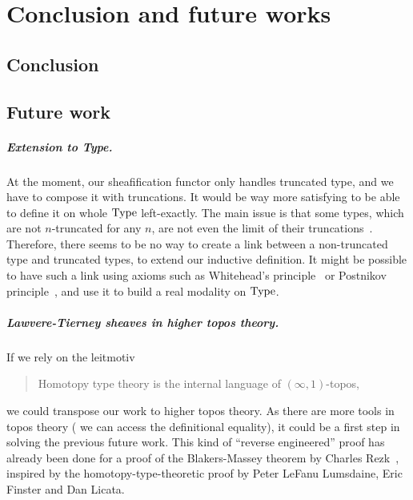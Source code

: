 \chapter{Conclusion and future works}
\label{chap:conclusion}

\section{Conclusion}
\section{Future work}

\paragraph*{Extension to Type.}
At the moment, our sheafification functor only handles truncated type,
and we have to compose it with truncations. It would be way more
satisfying to be able to define it on whole $\operatorname{Type}$ left-exactly. The
main issue is that some types, which are not $n$-truncated for any
$n$, are not even the limit of their
truncations~\cite{morelvv}. Therefore, there seems to be no way to
create a link between a non-truncated type and truncated types, to
extend our inductive definition.
It might be possible to have such a link using axioms such as
Whitehead's principle~\cite[Section 8.8]{hottbook} or Postnikov
principle~\cite[Section 5.5.6]{lurie}, and use it to build a real
modality on $\operatorname{Type}$.

\paragraph*{Lawvere-Tierney sheaves in higher topos theory.}
If we rely on the leitmotiv
\begin{quote}
  Homotopy type theory is the internal language of $(\infty,1)$-topos,
\end{quote}
we could transpose our work to higher topos theory. As there are more
tools in topos theory (\eg{} we can access the definitional equality),
it could be a first step in solving the previous future work.
This kind of ``reverse engineered'' proof has already been done for a
proof of the Blakers-Massey theorem by Charles Rezk~\cite{rezk-BM},
inspired by the homotopy-type-theoretic proof by Peter LeFanu
Lumsdaine, Eric Finster and Dan Licata.

